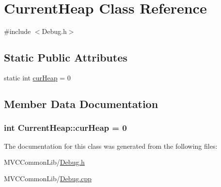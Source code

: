 \hypertarget{class_current_heap}{
\section{CurrentHeap Class Reference}
\label{class_current_heap}
}


{\ttfamily \#include $<$Debug.h$>$}

\subsection*{Static Public Attributes}
\begin{DoxyCompactItemize}
\item 
static int \hyperlink{class_current_heap_a810bf94894ae33cb375e353219e6a209}{curHeap} = 0
\end{DoxyCompactItemize}


\subsection{Member Data Documentation}
\hypertarget{class_current_heap_a810bf94894ae33cb375e353219e6a209}{
\subsubsection[{curHeap}]{\setlength{\rightskip}{0pt plus 5cm}int {\bf CurrentHeap::curHeap} = 0}}
\label{class_current_heap_a810bf94894ae33cb375e353219e6a209}


The documentation for this class was generated from the following files:\begin{DoxyCompactItemize}
\item 
MVCCommonLib/\hyperlink{_debug_8h}{Debug.h}\item 
MVCCommonLib/\hyperlink{_debug_8cpp}{Debug.cpp}\end{DoxyCompactItemize}
